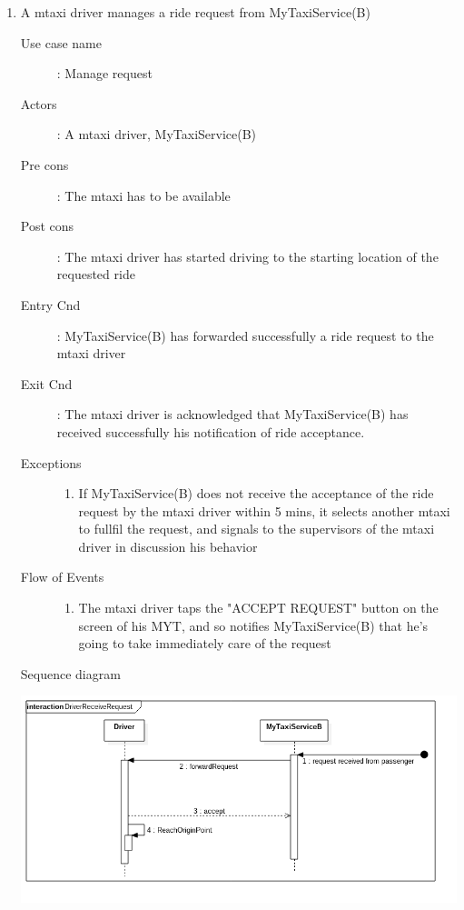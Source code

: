 \documentclass[11pt]{article} %
\begin{document}
\begin{enumerate}
	
	        \item A mtaxi driver manages a ride request from MyTaxiService(B)
		\begin{description}
		        \item [Use case name]: Manage request
		        \item [Actors]: A mtaxi driver, MyTaxiService(B)
		        \item [Pre cons]: The mtaxi has to be available
		        \item [Post cons]: The mtaxi driver has started driving to the starting location of the requested ride
		        \item [Entry Cnd]: MyTaxiService(B) has forwarded successfully a ride request to the mtaxi driver
		        \item [Exit Cnd]: The mtaxi driver is acknowledged that MyTaxiService(B) has received successfully his notification
		        of ride acceptance.
		        \item [Exceptions]\hfill
			\begin{enumerate}
			          \item If MyTaxiService(B) does not receive the acceptance of the ride request by the mtaxi driver
			          within 5 mins, it selects another mtaxi to fullfil the request, and signals to the supervisors
			          of the mtaxi driver in discussion his behavior
			\end{enumerate}
		        \item [Flow of Events]\hfill
			\begin{enumerate}
			          \item The mtaxi driver taps the "ACCEPT REQUEST" button on the screen of his MYT, and so notifies MyTaxiService(B)
			          that he's going to take immediately care of the request
			\end{enumerate}
		\end{description}
		\newpage
		Sequence diagram
		\begin{center}
		\includegraphics[scale=0.52]{usecase5.png}
		\end{center}
	

\end{enumerate}
\end{document}
